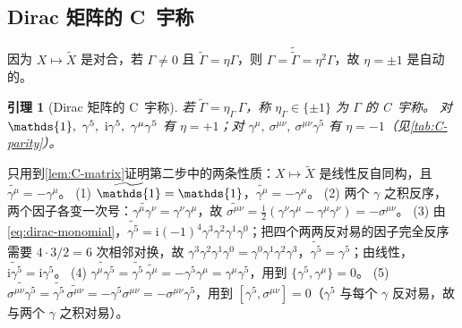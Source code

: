 \documentclass[UTF8,a4paper,11pt,fontset=fandol]{ctexart}
\makeatletter
\let\amsmathbb\mathbb
\renewcommand{\mathbb}[1]{\ifx1#1\mathds{1}\else\amsmathbb{#1}\fi}
\theoremstyle{cplain}
\newtheorem{lemma}[theorem]{引理}
\theoremstyle{cdefinition}
\theoremstyle{cremark}
\renewcommand{\proofname}{证明}
\renewenvironment{proof}[1][\proofname]{\par\pushQED{\qed}\normalfont\topsep6\p@\@plus6\p@\relax
  \trivlist\item[\hskip\labelsep\itshape #1\hspace{0.5em}]\ignorespaces}{\popQED\endtrivlist\@endpefalse}
\numberwithin{equation}{section}
\newcommand{\ii}{\mathrm{i}}                        %
\newcommand{\Cconj}[1]{\widetilde{#1}}              %
\makeatother
\begin{document}
\subsection{Dirac 矩阵的 C~宇称}\label{sec:dirac-parity}

因为 $X\mapsto\Cconj X$ 是对合，若 $\Gamma\neq0$ 且 $\Cconj\Gamma=\eta\Gamma$，则 $\Gamma=\Cconj{\Cconj\Gamma}=\eta^2\Gamma$，故 $\eta=\pm1$ 是自动的。

\begin{lemma}[Dirac 矩阵的 C~宇称]\label{lem:C-parity}
若 $\Cconj\Gamma=\eta_\Gamma\,\Gamma$，称 $\eta_\Gamma\in\{\pm1\}$ 为 $\Gamma$ 的 C~宇称。
对 $\mathbb 1,\ \gamma^5,\ \ii\gamma^5,\ \gamma^\mu\gamma^5$ 有 $\eta=+1$；对 $\gamma^\mu,\ \sigma^{\mu\nu},\ \sigma^{\mu\nu}\gamma^5$ 有 $\eta=-1$（见\cref{tab:C-parity}）。
\end{lemma}

\begin{proof}
只用到\cref{lem:C-matrix}证明第二步中的两条性质：$X\mapsto\Cconj X$ 是线性反自同构，且 $\Cconj{\gamma^\mu}=-\gamma^\mu$。
(1) $\Cconj{\mathbb 1}=\mathbb 1$，$\Cconj{\gamma^\mu}=-\gamma^\mu$。
(2) 两个 $\gamma$ 之积反序，两个因子各变一次号：$\Cconj{\gamma^\mu\gamma^\nu}=\gamma^\nu\gamma^\mu$，故 $\Cconj{\sigma^{\mu\nu}}=\tfrac{\ii}{2}(\gamma^\nu\gamma^\mu-\gamma^\mu\gamma^\nu)=-\sigma^{\mu\nu}$。
(3) 由\cref{eq:dirac-monomial}，$\Cconj{\gamma^5}=\ii(-1)^4\gamma^3\gamma^2\gamma^1\gamma^0$；把四个两两反对易的因子完全反序需要 $4\cdot3/2=6$ 次相邻对换，故 $\gamma^3\gamma^2\gamma^1\gamma^0=\gamma^0\gamma^1\gamma^2\gamma^3$，$\Cconj{\gamma^5}=\gamma^5$；由线性，$\Cconj{\ii\gamma^5}=\ii\gamma^5$。
(4) $\Cconj{\gamma^\mu\gamma^5}=\Cconj{\gamma^5}\,\Cconj{\gamma^\mu}=-\gamma^5\gamma^\mu=\gamma^\mu\gamma^5$，用到 $\{\gamma^5,\gamma^\mu\}=0$。
(5) $\Cconj{\sigma^{\mu\nu}\gamma^5}=\Cconj{\gamma^5}\,\Cconj{\sigma^{\mu\nu}}=-\gamma^5\sigma^{\mu\nu}=-\sigma^{\mu\nu}\gamma^5$，用到 $[\gamma^5,\sigma^{\mu\nu}]=0$（$\gamma^5$ 与每个 $\gamma$ 反对易，故与两个 $\gamma$ 之积对易）。
\end{proof}
\end{document}
